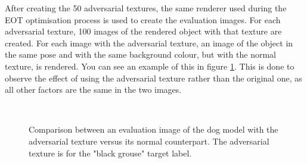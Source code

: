After creating the 50 adversarial textures, the same renderer used during the EOT optimisation process is used to create the evaluation images. For each adversarial texture, 100 images of the rendered object with that texture are created. For each image with the adversarial texture, an image of the object in the same pose and with the same background colour, but with the normal texture, is rendered. You can see an example of this in figure \ref{fig:evaluation_images_comparison}. This is done to observe the effect of using the adversarial texture rather than the original one, as all other factors are the same in the two images.

\begin{figure}[H]
\centering
{}~ %
\\ %

\caption[Comparison between equivalent adversarial and normal images for evaluation.]{Comparison between an evaluation image of the dog model with the adversarial texture versus its normal counterpart. The adversarial texture is for the "black grouse" target label.}
\label{fig:evaluation_images_comparison}
\end{figure}

